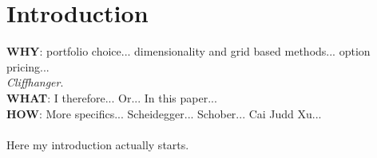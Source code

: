 \documentclass[11pt]{article}
\begin{document}
\fi

\section{Introduction}\label{sec:Introduction}
\textbf{WHY}: portfolio choice... dimensionality and grid based methods... option pricing... \\
\textit{Cliffhanger}.\\
\textbf{WHAT}: I therefore... Or... In this paper...\\
\textbf{HOW}: More specifics... Scheidegger... Schober... Cai Judd Xu...\\~\\
Here my introduction actually starts.

\ifdefined\COMPILINGMAIN
\else
\printbibliography
\end{document}
